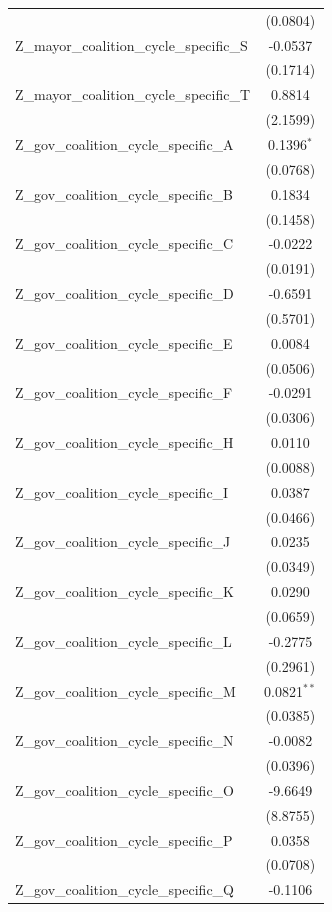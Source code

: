 \begin{tabular}{lc}
 & (0.0804) \\
Z\_mayor\_coalition\_cycle\_specific\_S & -0.0537 \\
 & (0.1714) \\
Z\_mayor\_coalition\_cycle\_specific\_T & 0.8814 \\
 & (2.1599) \\
Z\_gov\_coalition\_cycle\_specific\_A & 0.1396$^{*}$ \\
 & (0.0768) \\
Z\_gov\_coalition\_cycle\_specific\_B & 0.1834 \\
 & (0.1458) \\
Z\_gov\_coalition\_cycle\_specific\_C & -0.0222 \\
 & (0.0191) \\
Z\_gov\_coalition\_cycle\_specific\_D & -0.6591 \\
 & (0.5701) \\
Z\_gov\_coalition\_cycle\_specific\_E & 0.0084 \\
 & (0.0506) \\
Z\_gov\_coalition\_cycle\_specific\_F & -0.0291 \\
 & (0.0306) \\
Z\_gov\_coalition\_cycle\_specific\_H & 0.0110 \\
 & (0.0088) \\
Z\_gov\_coalition\_cycle\_specific\_I & 0.0387 \\
 & (0.0466) \\
Z\_gov\_coalition\_cycle\_specific\_J & 0.0235 \\
 & (0.0349) \\
Z\_gov\_coalition\_cycle\_specific\_K & 0.0290 \\
 & (0.0659) \\
Z\_gov\_coalition\_cycle\_specific\_L & -0.2775 \\
 & (0.2961) \\
Z\_gov\_coalition\_cycle\_specific\_M & 0.0821$^{**}$ \\
 & (0.0385) \\
Z\_gov\_coalition\_cycle\_specific\_N & -0.0082 \\
 & (0.0396) \\
Z\_gov\_coalition\_cycle\_specific\_O & -9.6649 \\
 & (8.8755) \\
Z\_gov\_coalition\_cycle\_specific\_P & 0.0358 \\
 & (0.0708) \\
Z\_gov\_coalition\_cycle\_specific\_Q & -0.1106 \\

\end{tabular}
